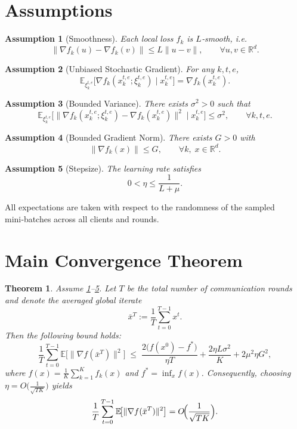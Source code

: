 \documentclass[11pt]{article}
\newtheorem{assumption}{Assumption}
\newtheorem{theorem}{Theorem}
\newcommand{\E}{\mathbb{E}}
\newcommand{\R}{\mathbb{R}}
\begin{document}
\newpage
\section*{Assumptions}
\begin{assumption}[Smoothness]\label{ass:smooth}
Each local loss $f_k$ is $L$‑smooth, i.e.
\[
    \|\nabla f_k(u)-\nabla f_k(v)\|\le L\|u-v\|,\qquad\forall u,v\in\R^{d}.
\]
\end{assumption}
\begin{assumption}[Unbiased Stochastic Gradient]\label{ass:unbiased}
For any $k,t,e$,
\[
    \E_{\xi_{k}^{t,e}}\!\bigl[\nabla f_k(x_{k}^{t,e};\xi_{k}^{t,e})\mid x_{k}^{t,e}\bigr]=\nabla f_k(x_{k}^{t,e}).
\]
\end{assumption}
\begin{assumption}[Bounded Variance]\label{ass:variance}
There exists $\sigma^{2}>0$ such that
\[
    \E_{\xi_{k}^{t,e}}\!\bigl[\|\nabla f_k(x_{k}^{t,e};\xi_{k}^{t,e})-\nabla f_k(x_{k}^{t,e})\|^{2}\mid x_{k}^{t,e}\bigr]\le\sigma^{2},
    \qquad\forall k,t,e.
\]
\end{assumption}
\begin{assumption}[Bounded Gradient Norm]\label{ass:gradbound}
There exists $G>0$ with
\[
    \|\nabla f_k(x)\|\le G,\qquad\forall k,\;x\in\R^{d}.
\]
\end{assumption}
\begin{assumption}[Stepsize]\label{ass:stepsize}
The learning rate satisfies
\[
    0<\eta\le\frac{1}{L+\mu}.
\]
\end{assumption}
All expectations are taken with respect to the randomness of the sampled mini‑batches across all clients and rounds.

\section*{Main Convergence Theorem}
\begin{theorem}\label{thm:main}
Assume \ref{ass:smooth}–\ref{ass:stepsize}. Let $T$ be the total number of communication rounds and denote the averaged global iterate
\[
    \bar{x}^{T}:=\frac{1}{T}\sum_{t=0}^{T-1}x^{t}.
\]
Then the following bound holds:
\[
    \frac{1}{T}\sum_{t=0}^{T-1}\E\!\bigl[\|\nabla f(\bar{x}^{T})\|^{2}\bigr]
    \;\le\;
    \frac{2\bigl(f(x^{0})-f^{*}\bigr)}{\eta T}
    +\frac{2\eta L\sigma^{2}}{K}
    +2\mu^{2}\eta G^{2},
\]
where $f(x)=\frac{1}{K}\sum_{k=1}^{K}f_k(x)$ and $f^{*}=\inf_{x}f(x)$.
Consequently, choosing $\eta=O\!\bigl(\frac{1}{\sqrt{TK}}\bigr)$ yields
\[
    \frac{1}{T}\sum_{t=0}^{T-1}\E\!\bigl[\|\nabla f(\bar{x}^{T})\|^{2}\bigr]=O\!\Bigl(\frac{1}{\sqrt{TK}}\Bigr).
\]
\end{theorem}
\end{document}
